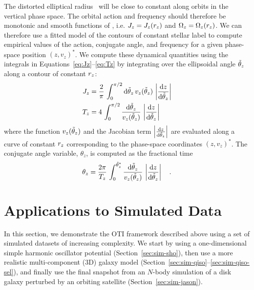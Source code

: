 The distorted elliptical radius \rz\ will be close to constant along orbits in the
vertical phase space.
The orbital action and frequency should therefore be monotonic and smooth functions of
\rz, i.e. $J_z = J_z(r_z)$ and $\Omega_z = \Omega_z(r_z)$.
We can therefore use a fitted model of the contours of constant stellar label to compute
empirical values of the action, conjugate angle, and frequency for a given phase-space
position $(z, v_z)^*$.
We compute these dynamical quantities using the integrals in
Equations~\ref{eq:Jz}--\ref{eq:Tz} by integrating over the ellipsoidal angle $\tilde{\theta}_z$
along a contour of constant $r_z$:
\begin{align}
    J_z &= \frac{2}{\pi} \, \int_0^{\pi/2} \mathrm{d} \tilde{\theta}_z \, v_z(\tilde{\theta}_z)
        \, \left|\frac{\mathrm{d} z}{\mathrm{d} \tilde{\theta}_z}\right| \label{eq:Jz-ell} \\
    T_z &= 4 \, \int_0^{\pi/2} \frac{\mathrm{d} \tilde{\theta}_z}{v_z(\tilde{\theta}_z)}
        \, \left|\frac{\mathrm{d} z}{\mathrm{d} \tilde{\theta}_z}\right| \label{eq:Tz-ell}
\end{align}
where the function $v_z(\tilde{\theta}_z)$ and the Jacobian term $\left|\frac{\mathrm{d} z}{\mathrm{d}
\tilde{\theta}_z}\right|$ are evaluated along a curve of constant $r_z$ corresponding to the
phase-space coordinates $(z, v_z)^*$.
The conjugate angle variable, $\theta_z$, is computed as the fractional time
\begin{equation}
    \theta_z = \frac{2\pi}{T_z} \, \int_0^{\tilde{\theta}_z^*} \frac{\mathrm{d} \tilde{\theta}_z}{v_z(\tilde{\theta}_z)}
        \, \left|\frac{\mathrm{d} z}{\mathrm{d} \tilde{\theta}_z}\right| \label{eq:thz-ell} \quad .
\end{equation}

\section{Applications to Simulated Data} \label{sec:applications-sim}

In this section, we demonstrate the OTI framework described above using a set of
simulated datasets of increasing complexity.
We start by using a one-dimensional simple harmonic oscillator potential
(Section~\ref{sec:sim-sho}), then use a more realistic multi-component (3D) galaxy model
(Section~\ref{sec:sim-qiso}--\ref{sec:sim-qiso-sel}), and finally use the final snapshot
from an $N$-body simulation of a disk galaxy perturbed by an orbiting satellite
(Section~\ref{sec:sim-jason}).

